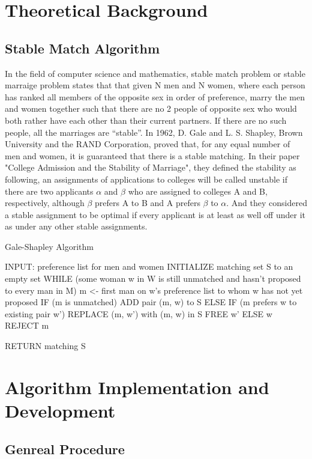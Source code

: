 \documentclass[twoside,twocolumn]{article}
\begin{document}
    \section{Theoretical Background}
    \subsection{Stable Match Algorithm}
    In the field of computer science and mathematics, stable match problem or stable marraige problem states that that given N men and N women, 
    where each person has ranked all members of the opposite sex in order of preference, marry the men and women together such that there are no 
    2 people of opposite sex who would both rather have each other than their current partners. If there are no such people, all the marriages are “stable”.
    In 1962, D. Gale and L. S. Shapley, Brown University and the RAND Corporation, proved that, for any equal number of men and women, it is guaranteed
    that there is a stable matching. In their paper "College Admission and the Stability of Marriage", they defined the stability as following, an assignments
    of applications to colleges will be called unstable if there are two applicants $\alpha$ and $\beta$ who are assigned to colleges A and B, respectively,
    although $\beta$ prefers A to B and A prefers $\beta$ to $\alpha$. And they considered a stable assignment to be optimal if every applicant is at least 
    as well off under it as under any other stable assignments.
    
    Gale-Shapley Algorithm
    \begin{spverbatim}
INPUT: preference list for men and women
INITIALIZE matching set S to an empty set
WHILE (some woman w in W is still unmatched and hasn't proposed to every man in M)
    m <- first man on w's preference list to whom w has not yet proposed
    IF (m is unmatched)
        ADD pair (m, w) to S
    ELSE IF (m prefers w to existing pair w')
        REPLACE (m, w') with (m, w) in S
        FREE w'
    ELSE 
        w REJECT m

RETURN matching S
    \end{spverbatim}

    \section{Algorithm Implementation and Development}
    \subsection{Genreal Procedure}
    
\end{document}
